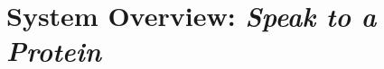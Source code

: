 \documentclass{article}
\begin{document}

\section{System Overview: \emph{Speak to a Protein}}\label{sec:overview}




\end{document}

